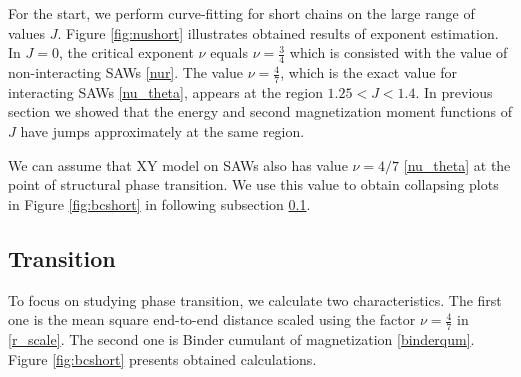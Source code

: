 For the start, we perform curve-fitting for short chains on the large range of values $J$. Figure \ref{fig:nushort} illustrates obtained results of exponent estimation. In $J=0$, the critical exponent $\nu$ equals $\nu = \frac{3}{4}$  which is consisted with the value of non-interacting SAWs \eqref{nur}. The value $\nu=\frac{4}{7}$, which is the exact value
for interacting SAWs \eqref{nu_theta}, appears at the region $ 1.25 < J < 1.4$. In previous section we showed that the energy and second magnetization moment functions of $J$ have jumps approximately at the same region. 

  We can assume that XY model on SAWs also has value $\nu = 4/7$ \eqref{nu_theta} at the point of structural phase transition. We use this value to obtain collapsing plots in Figure \ref{fig:bcshort} in following subsection \ref{section:Transition}. 







\subsection{Transition} \label{section:Transition}
To focus on studying phase transition, we calculate two characteristics. The first one is the mean square end-to-end distance scaled using the factor $\nu = \frac{4}{7}$ in \eqref{r_scale}. The second one is Binder cumulant of magnetization \eqref{binderqum}. Figure \ref{fig:bcshort}  presents obtained calculations. 

